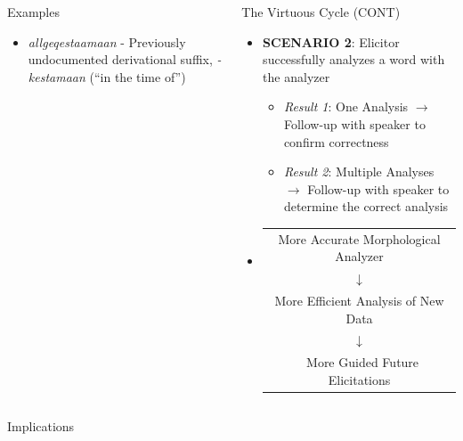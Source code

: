 \documentclass[usenames,dvipsnames]{beamer}
\begin{document}
\begin{frame}[fragile]
\begin{columns}
\begin{column}{0.3\textwidth}
\begin{block}{Examples}
\begin{itemize}
            \item \textit{allgeqestaamaan} - Previously undocumented derivational suffix, \textit{-kestamaan} (``in the time of'')
        \end{itemize}
\end{block}
\end{column}

\begin{column}{0.3\textwidth}
\begin{block}{The Virtuous Cycle ({\small CONT})}
\vspace*{8mm}
\begin{itemize}
\setlength\itemsep{48pt}
    \item \textbf{SCENARIO 2}: Elicitor successfully analyzes a word with the analyzer
    \vspace{24pt}
    \begin{itemize}
    \setlength\itemsep{24pt}
    \item \textit{Result 1}: One Analysis $\rightarrow$ Follow-up with speaker to confirm correctness
            
    \item \textit{Result 2}: Multiple Analyses $\rightarrow$ Follow-up with speaker to determine the correct analysis
    \end{itemize}
    
    \item
    \begin{tabular}[t]{c}
    More Accurate Morphological Analyzer \\
    $\downarrow$ \\
    More Efficient Analysis of New Data \\
    $\downarrow$ \\\
    More Guided Future Elicitations
    \end{tabular}
\end{itemize}
\vspace*{8mm}
\end{block}
\end{column}

\end{columns}

\vspace{18pt}

\begin{columns}[T]

\begin{column}{0.46\textwidth}
\begin{block}{Implications}


\end{block}
\end{column}
\end{columns}
\end{frame}
\end{document}
